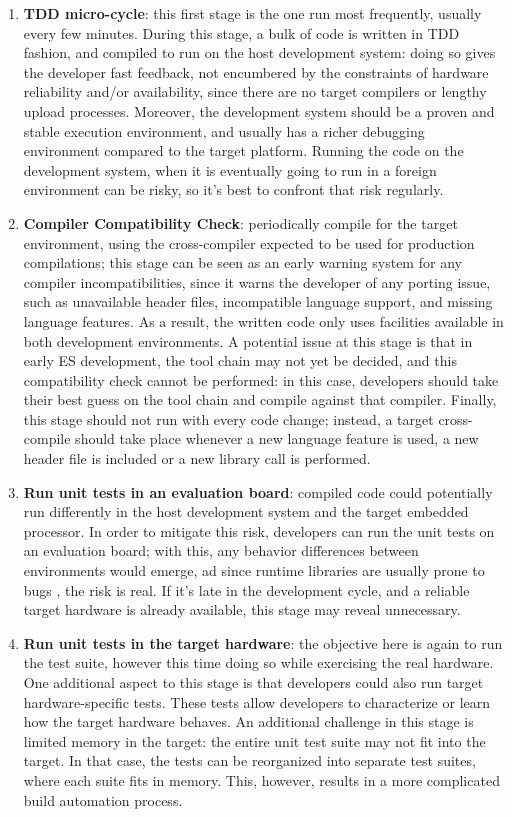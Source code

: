 \begin{enumerate}
    \item \textbf{TDD micro-cycle}: this first stage is the one run most frequently, usually every few minutes. During this stage, a bulk of code is written in TDD fashion, and compiled to run on the host development system: doing so gives the developer fast feedback, not encumbered by the constraints of hardware reliability and/or availability, since there are no target compilers or lengthy upload processes. 
    Moreover, the development system should be a proven and stable execution environment, and usually has a richer debugging environment compared to the target platform. 
    Running the code on the development system, when it is eventually going to run in a foreign environment can be risky, so it's best to confront that risk regularly.
    \item \textbf{Compiler Compatibility Check}: periodically compile for the target environment, using the cross-compiler expected to be used for production compilations; this stage can be seen as an early warning system for any compiler incompatibilities, since it warns the developer of any porting issue, such as unavailable header files, incompatible language support, and missing language features. 
    As a result, the written code only uses facilities available in both development environments.
    A potential issue at this stage is that in early ES development, the tool chain may not yet be decided, and this compatibility check cannot be performed: in this case, developers should take their best guess on the tool chain and compile against that compiler.
    Finally, this stage should not run with every code change; instead, a target cross-compile should take place whenever a new language feature is used, a new header file is included or a new library call is performed.
    \item \textbf{Run unit tests in an evaluation board}: compiled code could potentially run differently in the host development system and the target embedded processor. In order to mitigate this risk, developers can run the unit tests on an evaluation board; with this, any behavior differences between environments would emerge, ad since runtime libraries are usually prone to bugs \cite{TDDEC}, the risk is real. If it's late in the development cycle, and a reliable target hardware is already available, this stage may reveal unnecessary.
    \item \textbf{Run unit tests in the target hardware}: the objective here is again to run the test suite, however this time doing so while exercising the real hardware. One additional aspect to this stage is that developers could also run target hardware-specific tests. These tests allow developers to characterize or learn how the target hardware behaves. An additional challenge in this stage is limited memory in the target: the entire unit test suite may not fit into the target. In that case, the tests can be reorganized into separate test suites, where each suite fits in memory. This, however, results in a more complicated build automation process.

\end{enumerate}
